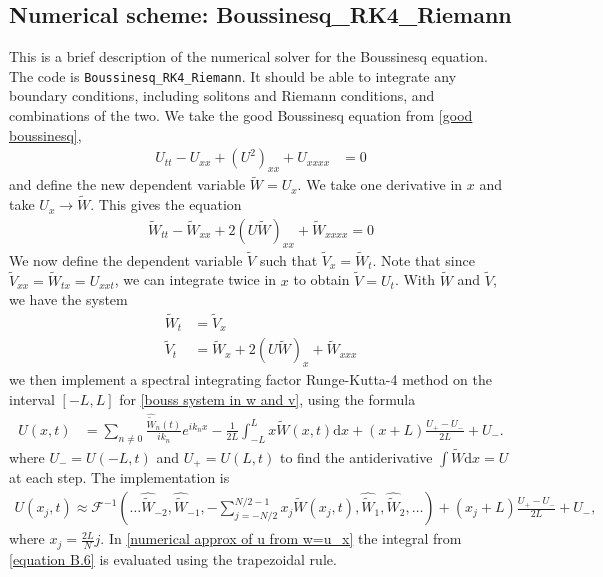 \documentclass[12pt]{article}
\newcommand{\dd}[0]{\mathrm{d}}
\numberwithin{equation}{section}
\begin{document}
\subsection{Numerical scheme: Boussinesq\_RK4\_Riemann}
This is a brief description of the numerical solver for the Boussinesq equation. The code is \texttt{Boussinesq\_RK4\_Riemann}. It should be able to integrate any boundary conditions, including solitons and Riemann conditions, and combinations of the two. We take the good Boussinesq equation from \eqref{good boussinesq},
\begin{align}
    U_{tt} - U_{xx} + (U^2)_{xx}  + U_{xxxx} &= 0 \label{good boussinesq}
\end{align}
and define the new dependent variable $\tilde{W} = U_x$. We take one derivative in $x$ and take $U_x \to \tilde{W}$. This gives the equation
\begin{align}
    \tilde{W}_{tt} - \tilde{W}_{xx} + 2 (U \tilde{W})_{xx} + \tilde{W}_{xxxx} = 0
\end{align}
We now define the dependent variable $\tilde{V}$ such that $\tilde{V}_x = \tilde{W}_t$. Note that since $\tilde{V}_{xx} = \tilde{W}_{tx} =U_{xxt}$, we can integrate twice in $x$ to obtain $\tilde{V} = U_t$. With $\tilde{W}$ and $\tilde{V}$, we have the system 
\begin{subequations}
    \begin{align}
        \tilde{W}_t &= \tilde{V}_x \\
        \tilde{V}_t &= \tilde{W}_{x} + 2(U\tilde{W})_{x} + \tilde{W}_{xxx}
    \end{align} \label{bouss system in w and v}
\end{subequations} 
we then implement a spectral integrating factor Runge-Kutta-4 method on the interval $[-L,L]$ for \eqref{bouss system in w and v}, using the formula 
\begin{align}
     U(x,t) &= \sum_{n \neq 0} \frac{\hat{\tilde{W}}_n(t)}{ik_n}e^{ik_nx} - \frac{1}{2L}\int_{-L}^Lx\tilde{W}(x,t)\dd x  + (x+L)\frac{U_+-U_-}{2L} + U_- . \label{equation B.6}
\end{align}
where $U_- = U(-L,t)$ and $U_+ = U(L,t)$ to find the antiderivative $\int \tilde{W} \dd x = U$ at each step. The implementation is 
\begin{align}
    U(x_j,t) \approx \mathcal{F}^{-1}\left( \ldots \hat{\tilde{W}}_{-2},\hat{\tilde{W}}_{-1}, - \sum_{j=-N/2}^{N/2-1}x_j\tilde{W}(x_j,t), \hat{\tilde{W}}_1, \hat{\tilde{W}}_2, \ldots \right) + (x_j+L)\frac{U_+-U_-}{2L} + U_-, \label{numerical approx of u from w=u_x}
\end{align}
where $x_j = \frac{2L}{N}j$. In \eqref{numerical approx of u from w=u_x} the integral from \eqref{equation B.6} is evaluated using the trapezoidal rule.
\end{document}
